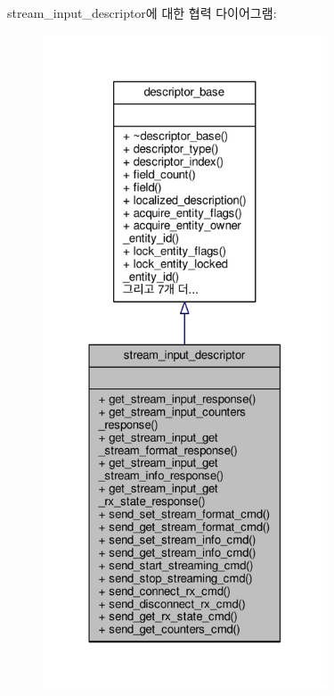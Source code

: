 stream\+\_\+input\+\_\+descriptor에 대한 협력 다이어그램\+:
\nopagebreak
\begin{figure}[H]
\begin{center}
\leavevmode
\includegraphics[height=550pt]{classavdecc__lib_1_1stream__input__descriptor__coll__graph}
\end{center}
\end{figure}
